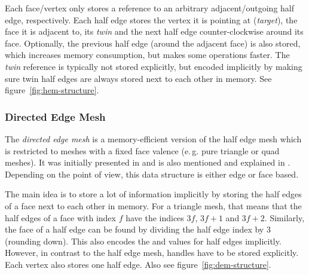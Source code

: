 Each face/vertex only stores a reference to an arbitrary adjacent/outgoing half edge, respectively.
Each half edge stores the vertex it is pointing at (\emph{target}), the face it is adjacent to, its \emph{twin} and the next half edge counter-clockwise around its face.
Optionally, the previous half edge (around the adjacent face) is also stored, which increases memory consumption, but makes some operations faster.
The \emph{twin} reference is typically not stored explicitly, but encoded implicitly by making sure twin half edges are always stored next to each other in memory.
See figure~\ref{fig:hem-structure}.


\newpage
\subsubsection*{Directed Edge Mesh}

The \emph{directed edge mesh} is a memory-efficient version of the half edge mesh which is restricted to meshes with a fixed face valence (e.\,g. pure triangle or quad meshes).
It was initially presented in \cite{campagna1998directed} and is also mentioned and explained in \cite[Chapter~2]{botsch2010polygon}.
Depending on the point of view, this data structure is either edge or face based.

The main idea is to store a lot of information implicitly by storing the half edges of a face next to each other in memory.
For a triangle mesh, that means that the half edges of a face with index $f$ have the indices $3f$, $3f + 1$ and $3f + 2$.
Similarly, the face of a half edge can be found by dividing the half edge index by 3 (rounding down).
This also encodes the  and  values for half edges implicitly.
However, in contrast to the half edge mesh,  handles have to be stored explicitly.
Each vertex also stores one  half edge.
Also see figure~\ref{fig:dem-structure}.

